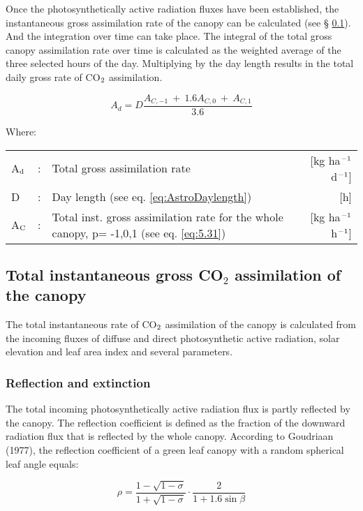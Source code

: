 Once the photosynthetically active radiation fluxes have been established, the 
instantaneous gross assimilation rate of the canopy can be calculated (see \S
\ref{sec:InstantGrossAssimilation}). And the integration over time can take place.
The integral of the total gross canopy assimilation rate over time is calculated as the
weighted average of the three selected hours of the day. Multiplying by the day length
results in the total daily gross rate of CO$_{{\rm 2}}$ assimilation. 

\begin{equation}
\label{eq:5.11}
A_{d} = D {\frac{A_{C,-1} ~+~ 1.6 A_{C,0} ~+~ A_{C,1} }{3.6}}
\end{equation}

Where:\\[5pt]
\begin{tabularx}{\textwidth}{llXr}
	A$_{{\rm d}}$ &:& Total gross assimilation rate    &    
	[kg ha$^{{\rm -1}}$ d$^{{\rm -1}}$]\\
	D &:& Day length (see eq. \ref{eq:AstroDaylength})   &     [h]\\
	A$_{{\rm C}}$ &:& Total inst. gross assimilation rate for
	the whole canopy, p= -1,0,1 (see eq. \ref{eq:5.31})    &
	[kg ha$^{{\rm -1}}$ h$^{{\rm -1}}$]\\
\end{tabularx}

\subsection{Total instantaneous gross CO$_{2}$ assimilation of the canopy}  
\label{sec:InstantGrossAssimilation}

The total instantaneous rate of CO$_{{\rm 2}}$ assimilation of the canopy is
calculated from the incoming fluxes of diffuse and direct photosynthetic active radiation,
solar elevation and leaf area index and several parameters.

\subsubsection{Reflection and extinction}
The total incoming photosynthetically active radiation flux is partly reflected by the
canopy. The reflection coefficient is defined as the fraction of the downward radiation
flux that is reflected by the whole canopy. According to Goudriaan (1977), the reflection
coefficient of a green leaf canopy with a random spherical leaf angle equals:

\begin{equation}
\label{eq:5.12}
\rho = {\frac{1- \sqrt{1-\sigma}}{1 + \sqrt{1-\sigma}}} \cdot {\frac{2}{1+1.6 \sin \beta }}
\end{equation}

